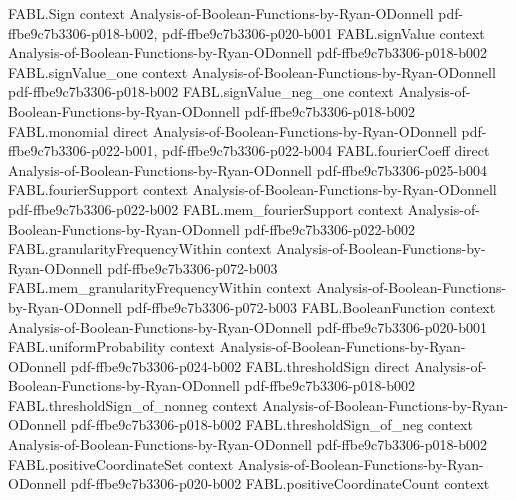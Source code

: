 \begin{theorem}
\label{FABL.booleanInfluence_dictator_of_ne}
\leanok
{}
\proofstep
  {FABL.Sign}
  {context}
  {Analysis-of-Boolean-Functions-by-Ryan-ODonnell}
  {pdf-ffbe9c7b3306-p018-b002,
    pdf-ffbe9c7b3306-p020-b001}
\proofstep
  {FABL.signValue}
  {context}
  {Analysis-of-Boolean-Functions-by-Ryan-ODonnell}
  {pdf-ffbe9c7b3306-p018-b002}
\proofstep
  {FABL.signValue_one}
  {context}
  {Analysis-of-Boolean-Functions-by-Ryan-ODonnell}
  {pdf-ffbe9c7b3306-p018-b002}
\proofstep
  {FABL.signValue_neg_one}
  {context}
  {Analysis-of-Boolean-Functions-by-Ryan-ODonnell}
  {pdf-ffbe9c7b3306-p018-b002}
\proofstep
  {FABL.monomial}
  {direct}
  {Analysis-of-Boolean-Functions-by-Ryan-ODonnell}
  {pdf-ffbe9c7b3306-p022-b001,
    pdf-ffbe9c7b3306-p022-b004}
\proofstep
  {FABL.fourierCoeff}
  {direct}
  {Analysis-of-Boolean-Functions-by-Ryan-ODonnell}
  {pdf-ffbe9c7b3306-p025-b004}
\proofstep
  {FABL.fourierSupport}
  {context}
  {Analysis-of-Boolean-Functions-by-Ryan-ODonnell}
  {pdf-ffbe9c7b3306-p022-b002}
\proofstep
  {FABL.mem_fourierSupport}
  {context}
  {Analysis-of-Boolean-Functions-by-Ryan-ODonnell}
  {pdf-ffbe9c7b3306-p022-b002}
\proofstep
  {FABL.granularityFrequencyWithin}
  {context}
  {Analysis-of-Boolean-Functions-by-Ryan-ODonnell}
  {pdf-ffbe9c7b3306-p072-b003}
\proofstep
  {FABL.mem_granularityFrequencyWithin}
  {context}
  {Analysis-of-Boolean-Functions-by-Ryan-ODonnell}
  {pdf-ffbe9c7b3306-p072-b003}
\proofstep
  {FABL.BooleanFunction}
  {context}
  {Analysis-of-Boolean-Functions-by-Ryan-ODonnell}
  {pdf-ffbe9c7b3306-p020-b001}
\proofstep
  {FABL.uniformProbability}
  {context}
  {Analysis-of-Boolean-Functions-by-Ryan-ODonnell}
  {pdf-ffbe9c7b3306-p024-b002}
\proofstep
  {FABL.thresholdSign}
  {direct}
  {Analysis-of-Boolean-Functions-by-Ryan-ODonnell}
  {pdf-ffbe9c7b3306-p018-b002}
\proofstep
  {FABL.thresholdSign_of_nonneg}
  {context}
  {Analysis-of-Boolean-Functions-by-Ryan-ODonnell}
  {pdf-ffbe9c7b3306-p018-b002}
\proofstep
  {FABL.thresholdSign_of_neg}
  {context}
  {Analysis-of-Boolean-Functions-by-Ryan-ODonnell}
  {pdf-ffbe9c7b3306-p018-b002}
\proofstep
  {FABL.positiveCoordinateSet}
  {context}
  {Analysis-of-Boolean-Functions-by-Ryan-ODonnell}
  {pdf-ffbe9c7b3306-p020-b002}
\proofstep
  {FABL.positiveCoordinateCount}
  {context}

\end{theorem}
